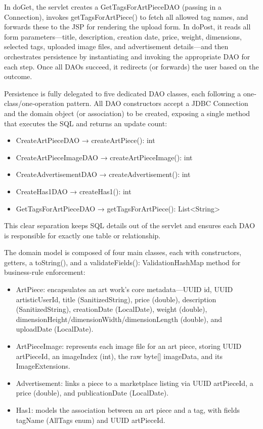 In doGet, the servlet creates a GetTagsForArtPieceDAO (passing in a Connection), invokes getTagsForArtPiece() to fetch all allowed tag names, and forwards these to the JSP for rendering the upload form. In doPost, it reads all form parameters—title, description, creation date, price, weight, dimensions, selected tags, uploaded image files, and advertisement details—and then orchestrates persistence by instantiating and invoking the appropriate DAO for each step. Once all DAOs succeed, it redirects (or forwards) the user based on the outcome.

Persistence is fully delegated to five dedicated DAO classes, each following a one‐class/one‐operation pattern. All DAO constructors accept a JDBC Connection and the domain object (or association) to be created, exposing a single method that executes the SQL and returns an update count:
\begin{itemize}
    \item CreateArtPieceDAO → createArtPiece(): int
    \item CreateArtPieceImageDAO → createArtPieceImage(): int
    \item CreateAdvertisementDAO → createAdvertisement(): int
    \item CreateHas1DAO → createHas1(): int
    \item GetTagsForArtPieceDAO → getTagsForArtPiece(): List<String>
\end{itemize}
This clear separation keeps SQL details out of the servlet and ensures each DAO is responsible for exactly one table or relationship.

The domain model is composed of four main classes, each with constructors, getters, a toString(), and a validateFields(): ValidationHashMap method for business‐rule enforcement:
\begin{itemize}
    \item ArtPiece: encapsulates an art work’s core metadata—UUID id, UUID artisticUserId, title (SanitizedString), price (double), description (SanitizedString), creationDate (LocalDate), weight (double), dimensionHeight/dimensionWidth/dimensionLength (double), and uploadDate (LocalDate).
    \item ArtPieceImage: represents each image file for an art piece, storing UUID artPieceId, an imageIndex (int), the raw byte[] imageData, and its ImageExtensions.
    \item Advertisement: links a piece to a marketplace listing via UUID artPieceId, a price (double), and publicationDate (LocalDate).
    \item Has1: models the association between an art piece and a tag, with fields tagName (AllTags enum) and UUID artPieceId.
\end{itemize}

